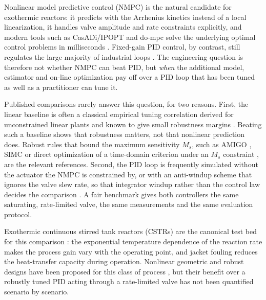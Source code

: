 
Nonlinear model predictive control (NMPC) is the natural candidate for exothermic reactors: it predicts with the Arrhenius kinetics instead of a local linearization, it handles valve amplitude and rate constraints explicitly, and modern tools such as CasADi/IPOPT and do-mpc solve the underlying optimal control problems in milliseconds \cite{rawlings2020model, hedengren2014nonlinear, fiedler2023dompc}. Fixed-gain PID control, by contrast, still regulates the large majority of industrial loops \cite{astrom2006pid, seborg2010process}. The engineering question is therefore not whether NMPC can beat PID, but \emph{when} the additional model, estimator and on-line optimization pay off over a PID loop that has been tuned as well as a practitioner can tune it.

Published comparisons rarely answer this question, for two reasons. First, the linear baseline is often a classical empirical tuning correlation derived for unconstrained linear plants and known to give small robustness margins \cite{odwyer2009handbook, garpinger2014performance}. Beating such a baseline shows that robustness matters, not that nonlinear prediction does. Robust rules that bound the maximum sensitivity $M_s$, such as AMIGO \cite{astrom2006pid}, SIMC \cite{skogestad2003simple, grimholt2018optimal} or direct optimization of a time-domain criterion under an $M_s$ constraint \cite{garpinger2014performance, padula2011tuning}, are the relevant references. Second, the PID loop is frequently simulated without the actuator the NMPC is constrained by, or with an anti-windup scheme that ignores the valve slew rate, so that integrator windup rather than the control law decides the comparison \cite{hippe2006windup, tarbouriech2009antiwindup, bohn1995analysis, peng1996nonlinear}. A fair benchmark gives both controllers the same saturating, rate-limited valve, the same measurements and the same evaluation protocol.

Exothermic continuous stirred tank reactors (CSTRs) are the canonical test bed for this comparison \cite{uppal1974dynamic, aris1958analysis, luyben2007chemical, bequette2003process}: the exponential temperature dependence of the reaction rate makes the process gain vary with the operating point, and jacket fouling reduces the heat-transfer capacity during operation. Nonlinear geometric and robust designs have been proposed for this class of process \cite{alvarez1989global}, but their benefit over a robustly tuned PID acting through a rate-limited valve has not been quantified scenario by scenario.

